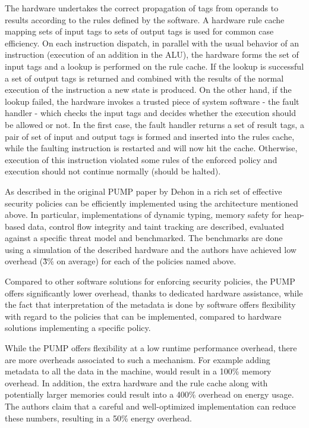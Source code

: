 The hardware undertakes the correct propagation of tags from operands
to results according to the rules defined by the software. A hardware
rule cache mapping sets of input tags to sets of output tags is used
for common case efficiency. On each instruction dispatch, in parallel
with the usual behavior of an instruction (\EG execution of an
addition in the ALU), the hardware forms the set of input tags and a
lookup is performed on the rule cache. If the lookup is successful a
set of output tags is returned and combined with the results of the
normal execution of the instruction a new state is produced. On the
other hand, if the lookup failed, the hardware invokes a trusted piece
of system software - the fault handler - which checks the input tags
and decides whether the execution should be allowed or not. In the
first case, the fault handler returns a set of result tags, a pair of
set of input and output tags is formed and inserted into the rules
cache, while the faulting instruction is restarted and will now hit
the cache. Otherwise, execution of this instruction violated some
rules of the enforced policy and execution should not continue
normally (\EG should be halted).

As described in the original PUMP paper by Dehon \ETAL in
\cite{pump_hasp2014} a rich set of effective security policies can be
efficiently implemented using the architecture mentioned above. In
particular, implementations of dynamic typing, memory safety for
heap-based data, control flow integrity and taint tracking are
described, evaluated against a specific threat model and
benchmarked. The benchmarks are done using a simulation of the
described hardware and the authors have achieved low overhead (\~3\% on
average) for each of the policies named above.

Compared to other software solutions for enforcing security policies,
the PUMP offers significantly lower overhead, thanks to dedicated
hardware assistance, while the fact that interpretation of the
metadata is done by software offers flexibility with regard to the
policies that can be implemented, compared to hardware solutions
implementing a specific policy.

While the PUMP offers flexibility at a low runtime performance
overhead, there are more overheads associated to such a mechanism. For
example adding metadata to all the data in the machine, would result
in a 100\% memory overhead.  In addition, the extra hardware and the
rule cache along with potentially larger memories could result into a
400\% overhead on energy usage. The authors claim that a careful and
well-optimized implementation can reduce these numbers, resulting in a
50\% energy overhead.

